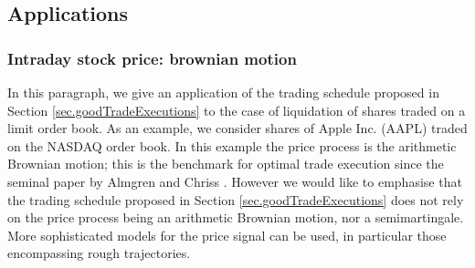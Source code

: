 \documentclass[10pt,a4paper]{article}
\begin{document}
	
	

	
	\subsection{Applications}\label{sec.applications}
	
	\subsubsection{Intraday stock price: brownian motion}
	In this  paragraph, we give an application of the trading schedule proposed in Section \ref{sec.goodTradeExecutions} to the case of liquidation of shares traded on a limit order book. As an example, we consider shares of Apple Inc. (AAPL) traded on the NASDAQ order book. In this example the price process is the arithmetic Brownian motion; this is the benchmark for optimal trade execution since the seminal paper by Almgren and Chriss \cite{AC00opt}. However we would like to emphasise  that the trading schedule proposed in Section \ref{sec.goodTradeExecutions} does not rely on the price process being an arithmetic Brownian motion, nor a semimartingale. More sophisticated models for the price signal can be used, in particular those encompassing rough trajectories.
	
\end{document}
